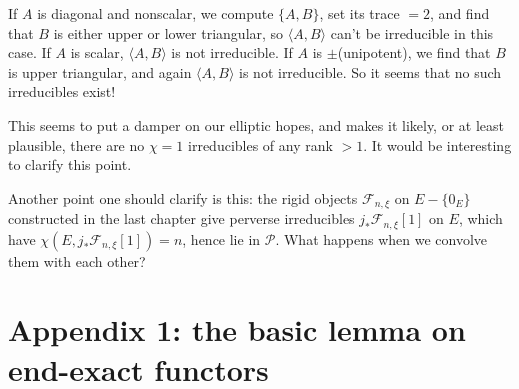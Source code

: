 If \(A\) is diagonal and nonscalar, we compute \(\{A,B\}\), set its trace
\(=2\), and find that \(B\) is either upper or lower triangular, so
\(\langle A,B\rangle\) can't be irreducible in this case. If \(A\) is scalar,
\(\langle A,B\rangle\) is not irreducible. If \(A\) is \(\pm\)(unipotent), we
find that \(B\) is upper triangular, and again \(\langle A,B\rangle\) is not
irreducible. So it seems that no such irreducibles exist!

This seems to put a damper on our elliptic hopes, and makes it likely, or at
least plausible, there are no \(\chi=1\) irreducibles of any rank \(>1\). It
would be interesting to clarify this point.

Another point one should clarify is this: the rigid objects
\(\mathcal{F}_{n,\xi}\) on \(E-\{0_E\}\) constructed in the last chapter give
perverse irreducibles \(j_*\mathcal{F}_{n,\xi}[1]\) on \(E\), which have
\(\chi(E,j_*\mathcal{F}_{n,\xi}[1])=n\), hence lie in \(\mathcal{P}\). What
happens when we convolve them with each other?

\section{Appendix 1: the basic lemma on end-exact functors}\label{sec:2.17}

